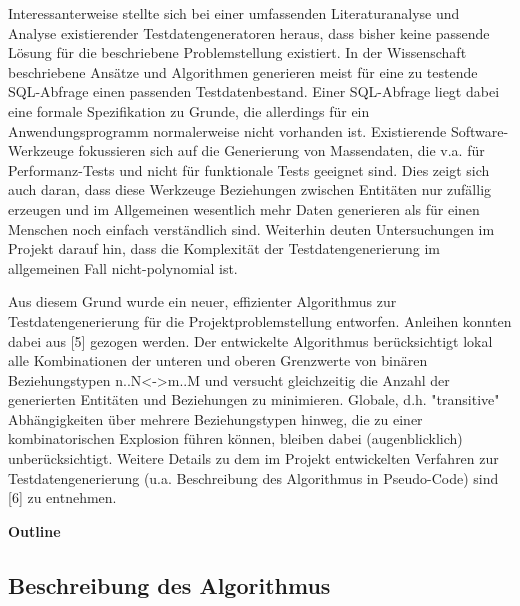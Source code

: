 Interessanterweise stellte sich bei einer umfassenden Literaturanalyse und Analyse existierender Testdatengeneratoren heraus, dass bisher keine passende Lösung für die beschriebene Problemstellung existiert. In der Wissenschaft beschriebene Ansätze und Algorithmen generieren meist für eine zu testende SQL-Abfrage einen passenden Testdatenbestand. Einer SQL-Abfrage liegt dabei eine formale Spezifikation zu Grunde, die allerdings für ein Anwendungsprogramm normalerweise nicht vorhanden ist. Existierende Software-Werkzeuge fokussieren sich auf die Generierung von Massendaten, die v.a. für Performanz-Tests und nicht für funktionale Tests geeignet sind. Dies zeigt sich auch daran, dass diese Werkzeuge Beziehungen zwischen Entitäten nur zufällig erzeugen und im Allgemeinen wesentlich mehr Daten generieren als für einen Menschen noch einfach verständlich sind. Weiterhin deuten Untersuchungen im Projekt darauf hin, dass die Komplexität der Testdatengenerierung im allgemeinen Fall nicht-polynomial ist.

Aus diesem Grund wurde ein neuer, effizienter Algorithmus zur Testdatengenerierung für die Projektproblemstellung entworfen. Anleihen konnten dabei aus [5] gezogen werden. Der entwickelte Algorithmus berücksichtigt lokal alle Kombinationen der unteren und oberen Grenzwerte von binären Beziehungstypen n..N<->m..M und versucht gleichzeitig die Anzahl der generierten Entitäten und Beziehungen zu minimieren. Globale, d.h. "transitive" Abhängigkeiten über mehrere Beziehungstypen hinweg, die zu einer kombinatorischen Explosion führen können, bleiben dabei (augenblicklich) unberücksichtigt. Weitere Details zu dem im Projekt entwickelten Verfahren zur Testdatengenerierung (u.a. Beschreibung des Algorithmus in Pseudo-Code) sind [6] zu entnehmen.

%



\textbf{Outline}



	\subsection{Beschreibung des Algorithmus}
	
